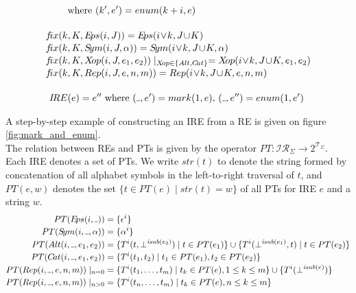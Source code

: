 \documentclass[AMA,STIX1COL]{WileyNJD-v2}
\newcommand{\Xund}{\rule{.4em}{.4pt}}
\newcommand{\XI}{\mathcal{I}}
\newcommand{\XIR}{\XI\!\XR}
\newcommand{\XR}{\mathcal{R}}
\newcommand{\XT}{\mathcal{T}}
\newcommand{\PT}{PT}
\newcommand{\IRE}{I\!RE}
\newcommand{\Eps}{E\!ps}
\newcommand{\Sym}{S\!ym}
\newcommand{\Alt}{Alt}
\newcommand{\Cat}{C\!at}
\newcommand{\Rep}{Rep}
\newcommand{\Xop}{X\!op}
\newcommand{\fix}{f\!ix}
\newcommand{\isub}{\mathit{isub}}
\begin{document}
\begin{align*}
\begin{aligned}
        &\text{where } (k', e') = enum(k + i, e) \\[-0.2em]
    \\[-0.2em]
    \fix (k&, K, \Eps(i, J))         = \Eps(i \!\vee\! k, J \!\cup\! K)         \\[-0.2em]
    \fix (k&, K, \Sym(i, J, \alpha)) = \Sym(i \!\vee\! k, J \!\cup\! K, \alpha) \\[-0.2em]
    \fix (k&, K, \Xop(i, J, e_1, e_2)) \mid_{\Xop \in \{\Alt, \Cat\}} = \Xop(i \!\vee\! k, J \!\cup\! K, e_1, e_2) \\[-0.2em]
    \fix (k&, K, \Rep(i, J, e, n, m)) = \Rep(i \!\vee\! k, J \!\cup\! K, e, n, m) \\[-0.2em]
    \\[-0.2em]
    \IRE&(e) = e'' \text{ where }(\Xund, e') = mark(1, e), \, (\Xund, e'') = enum(1, e')
\end{aligned}
\end{align*}
\medskip

A step-by-step example of constructing an IRE from a RE is given on figure \ref{fig:mark_and_enum}.
\\

The relation between REs and PTs is given by the operator $\PT : \XIR_\Sigma \rightarrow 2^{\XT_\Sigma}$.
Each IRE denotes a set of PTs.
%
We write $str(t)$ to denote the string formed by concatenation of all alphabet symbols in the left-to-right traversal of $t$,
and $\PT(e, w)$ denotes the set $\big\{ t \in \PT(e) \mid str(t) = w \big\}$ of all PTs for IRE $e$ and a string $w$.
%
\begin{align*}
    \PT(\Eps(i, \Xund))         &= \{ {\epsilon}^{i} \} \\[-0.2em]
    \PT(\Sym(i, \Xund, \alpha)) &= \{ {\alpha}^{i} \}   \\[-0.2em]
    \PT(\Alt(i, \Xund, e_1, e_2)) &=
        \{ {T}^{i}(t, \bot^{\isub(e_2)}) \mid t \in \PT(e_1) \} \cup
        \{ {T}^{i}(\bot^{\isub(e_1)}, t) \mid t \in \PT(e_2) \}
    \\[-0.2em]
    \PT(\Cat(i, \Xund, e_1, e_2)) &=
        \{ {T}^{i}(t_1, t_2) \mid
            t_1 \in \PT(e_1),
            t_2 \in \PT(e_2)
        \}
    \\[-0.2em]
    \PT(\Rep(i, \Xund, e, n, m)) \mid_{n = 0} &=
        \{ {T}^{i}(t_1, \dots, t_m) \mid t_k \in \PT(e), 1 \leq k \leq m \}
            \cup \{ {T}^{i}(\bot^{\isub(e)}) \}
    \\[-0.2em]
    \PT(\Rep(i, \Xund, e, n, m)) \mid_{n > 0} &=
        \{ {T}^{i}(t_n, \dots, t_m) \mid t_k \in \PT(e), n \leq k \leq m \}
\end{align*}
\end{document}
